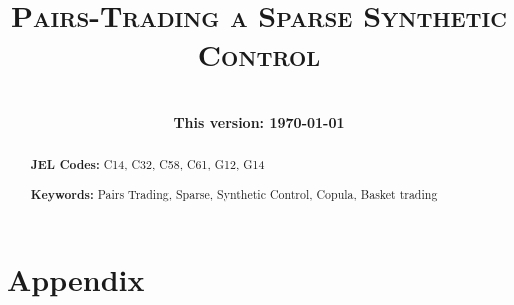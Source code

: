 \documentclass[12pt,a4paper]{article}
\title{\textsc{
\Large 
Pairs-Trading %
a Sparse Synthetic Control 
}
}
\author[1]{
{  
}

%

\small \textbf{This version: \mydate\today}
}
\date{}
\begin{document}
\maketitle
\thispagestyle{empty}
\begin{abstract}
 

\bx 
\noindent\textbf{JEL Codes:} C14, C32, C58, C61, G12, G14

\mx 
\noindent\textbf{Keywords:} Pairs Trading, Sparse, Synthetic Control, Copula, Basket trading
\end{abstract}

\newpage
\setcounter{page}{1}



%












\newpage
\processdelayedfloats 
\renewcommand{\thefigure}{A\arabic{figure}} 
\renewcommand{\thetable}{A\arabic{table}}

\appendix
\newpage
\section{Appendix}

\end{document}

